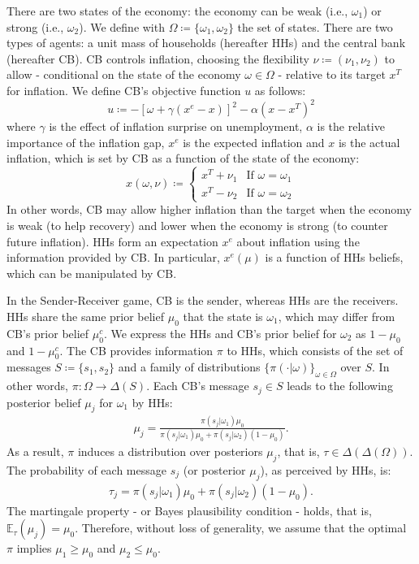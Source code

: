 \documentclass[12pt,a4paper]{article}
\begin{document}
There are two states of the economy: the economy can be weak (i.e., $\omega_1$) or strong (i.e., $\omega_2$). We define with $\Omega \coloneqq \{\omega_1, \omega_2\}$ the set of states.
There are two types of agents: a unit mass of households (hereafter HHs) and the central bank (hereafter CB). CB controls inflation, choosing the flexibility $\nu\coloneqq(\nu_1,\nu_2)$ to allow - conditional on the state of the economy $\omega\in \Omega$ - relative to its target $x^T$ for inflation. We define CB's objective function $u$ as follows:%
\begin{equation}
    \label{uc}
    u \coloneqq -\left[\omega+\gamma(x^e-x)\right]^2-\alpha(x-x^T)^2
\end{equation}
where $\gamma$ is the effect of inflation surprise on unemployment, $\alpha$ is the relative importance of the inflation gap, $x^e$ is the expected inflation and $x$ is the actual inflation, which is set by CB as a function of the state of the economy: 
\begin{equation}
    x(\omega,\nu)\coloneqq\left\{
    \begin{array}{cc}
      x^T+\nu_1&  \mbox{If } \omega=\omega_1\\
      x^T-\nu_2   &  \mbox{If } \omega=\omega_2
    \end{array}
    \right.
\end{equation}
In other words, CB may allow higher inflation than the target when the economy is weak (to help recovery) and lower when the economy is strong (to counter future inflation).
HHs form an expectation $x^e$ about inflation using the information provided by CB. In particular, $x^e(\mu)$ is a function of HHs beliefs, which can be manipulated by CB.

In the Sender-Receiver game, CB is the sender, whereas HHs are the receivers.
HHs share the same prior belief $\mu_0$ that the state is $\omega_1$, which may differ from CB's prior belief $\mu_0^c$. We express the HHs and CB's prior belief for $\omega_2$ as $1-\mu_0$ and $1-\mu^c_0$. 
The CB provides information $\pi$ to HHs, which consists of the set of messages $S\coloneqq \{s_1, s_2\}$ and a family of distributions $\{\pi(\cdot|\omega)\}_{\omega\in\Omega}$ over $S$. In other words, $\pi: \Omega \to \Delta(S)$. Each CB's message $s_j\in S$ leads to the following posterior belief $\mu_j$ for $\omega_1$ by HHs:
\begin{align}
    \mu_j = \frac{\pi(s_j|\omega_1)\mu_0}{\pi(s_j|\omega_1)\mu_0 + \pi(s_j|\omega_2)(1-\mu_0)}.
\end{align}
As a result, $\pi$ induces a distribution over posteriors $\mu_j$, that is, $\tau \in \Delta(\Delta(\Omega))$. The probability of each message $s_j$ (or posterior $\mu_j$), as perceived by HHs, is: 
\begin{align}
\label{tau}
    \tau_j = \pi(s_j|\omega_1)\mu_0 + \pi(s_j|\omega_2)(1-\mu_0).
\end{align}
The martingale property - or Bayes plausibility condition - holds, that is, $\mathbb{E}_{\tau}(\mu_j)=\mu_0$. Therefore, without loss of generality, we assume that the optimal $\pi$ implies $\mu_1\geq\mu_0$ and $\mu_2\leq\mu_0$. 
\end{document}
